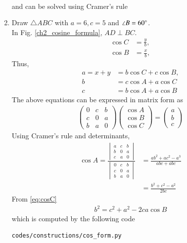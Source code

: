 \begin{enumerate}[label=\arabic*.,ref=\thesubsection.\theenumi]
\begin{align}
\end{align}
%
and can be solved using Cramer's rule
\item Draw $\triangle ABC$ with $a = 6, c = 5$ and $\angle B = 60 \degree$. 
\\
\solution 
In Fig. \eqref{ch2_cosine_formula}, $AD \perp BC$.
\begin{align}
\cos C &= \frac{y}{b},
\\
\cos B &= \frac{x}{b},
\end{align}
%
Thus, 
%
\begin{align}
a=x+y &= b \cos C + c \cos B, \\
b &= c \cos A + a \cos C \\
c &= b \cos A + a \cos B
\end{align}
%
  The above equations can be expressed in matrix form as
%
\begin{align}
\begin{pmatrix}
0 & c & b \\
c & 0 & a \\
b & a & 0
\end{pmatrix}
\begin{pmatrix}
\cos A \\
\cos B \\
\cos C
\end{pmatrix}
= 
\begin{pmatrix}
a\\
b\\
c
\end{pmatrix}
\end{align}
%
Using Cramer's rule and determinants,
%
\begin{align}
\cos A = \frac{
\begin{vmatrix}
a & c & b \\
b & 0 & a \\
c & a & 0
\end{vmatrix}
	}
	{
\begin{vmatrix}
0 & c & b \\
c & 0 & a \\
b & a & 0
\end{vmatrix}
	}
	&=\frac{ab^2 + ac^2 - a^3}{abc + abc} 
\\
&= \frac{b^2 + c^2 - a^2}{2bc}
\label{eq:cosC}
\end{align}
From \eqref{eq:cosC}
\begin{align}
\label{eq:b_cos_form}
b^2 = c^2+a^2-2ca\cos B
\end{align}
which is computed by the following code
\begin{lstlisting}
codes/constructions/cos_form.py
\end{lstlisting}
%
\begin{figure}[!ht]
	\begin{center}
		

\end{center}
\end{figure}
\end{enumerate}
